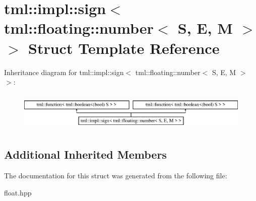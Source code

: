 \hypertarget{structtml_1_1impl_1_1sign_3_01tml_1_1floating_1_1number_3_01S_00_01E_00_01M_01_4_01_4}{\section{tml\+:\+:impl\+:\+:sign$<$ tml\+:\+:floating\+:\+:number$<$ S, E, M $>$ $>$ Struct Template Reference}
\label{structtml_1_1impl_1_1sign_3_01tml_1_1floating_1_1number_3_01S_00_01E_00_01M_01_4_01_4}
}
Inheritance diagram for tml\+:\+:impl\+:\+:sign$<$ tml\+:\+:floating\+:\+:number$<$ S, E, M $>$ $>$\+:\begin{figure}[H]
\begin{center}
\leavevmode
\includegraphics[height=1.898305cm]{structtml_1_1impl_1_1sign_3_01tml_1_1floating_1_1number_3_01S_00_01E_00_01M_01_4_01_4}
\end{center}
\end{figure}
\subsection*{Additional Inherited Members}


The documentation for this struct was generated from the following file\+:\begin{DoxyCompactItemize}
\item 
float.\+hpp\end{DoxyCompactItemize}
